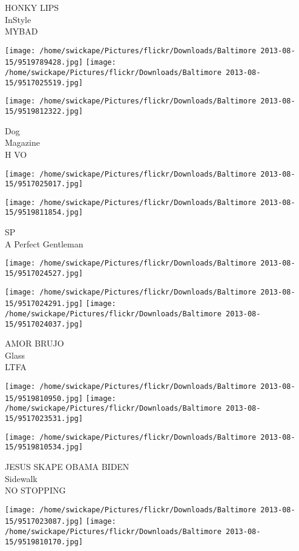 \documentclass[10pt,letterpaper]{article}
\begin{document}
HONKY LIPS\\
InStyle\\
MYBAD
\pagebreak

\texttt{[image: /home/swickape/Pictures/flickr/Downloads/Baltimore 2013-08-15/9519789428.jpg]}
\texttt{[image: /home/swickape/Pictures/flickr/Downloads/Baltimore 2013-08-15/9517025519.jpg]}

\texttt{[image: /home/swickape/Pictures/flickr/Downloads/Baltimore 2013-08-15/9519812322.jpg]}

Dog\\
Magazine\\
H VO
\pagebreak

\texttt{[image: /home/swickape/Pictures/flickr/Downloads/Baltimore 2013-08-15/9517025017.jpg]}

\vspace{0.25in}
\texttt{[image: /home/swickape/Pictures/flickr/Downloads/Baltimore 2013-08-15/9519811854.jpg]}

SP\\
A Perfect Gentleman
\pagebreak

\texttt{[image: /home/swickape/Pictures/flickr/Downloads/Baltimore 2013-08-15/9517024527.jpg]}

\vspace{0.25in}
\texttt{[image: /home/swickape/Pictures/flickr/Downloads/Baltimore 2013-08-15/9517024291.jpg]}
\texttt{[image: /home/swickape/Pictures/flickr/Downloads/Baltimore 2013-08-15/9517024037.jpg]}

AMOR BRUJO\\
Glass\\
LTFA
\pagebreak

\texttt{[image: /home/swickape/Pictures/flickr/Downloads/Baltimore 2013-08-15/9519810950.jpg]}
\texttt{[image: /home/swickape/Pictures/flickr/Downloads/Baltimore 2013-08-15/9517023531.jpg]}

\vspace{0.25in}
\texttt{[image: /home/swickape/Pictures/flickr/Downloads/Baltimore 2013-08-15/9519810534.jpg]}

JESUS SKAPE OBAMA BIDEN\\
Sidewalk\\
NO STOPPING
\pagebreak

\texttt{[image: /home/swickape/Pictures/flickr/Downloads/Baltimore 2013-08-15/9517023087.jpg]}
\texttt{[image: /home/swickape/Pictures/flickr/Downloads/Baltimore 2013-08-15/9519810170.jpg]}
\end{document}
